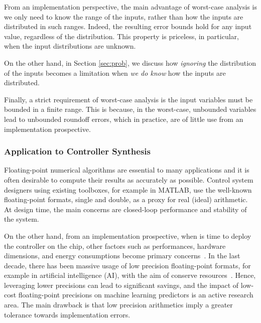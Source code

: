 %
From an implementation perspective, the main advantage of worst-case analysis is we only need to know the range of the inputs, rather than how the inputs are distributed in such ranges. 
%
Indeed, the resulting error bounds hold for any input value, regardless of the distribution.
%
%
This property is priceless, in particular, when the input distributions are unknown.
%

On the other hand, in Section \ref{sec:prob}, we discuss how \emph{ignoring} the distribution of the inputs becomes a limitation when \emph{we do know} how the inputs are distributed.
%

Finally, a strict requirement of worst-case analysis is the input variables must be bounded  in a finite range. This is because, in the worst-case, unbounded variables lead to unbounded roundoff errors, which in practice, are of little use from an implementation prospective.
\subsubsection{Application to Controller Synthesis}
Floating-point numerical algorithms are essential to many applications and it is often desirable to compute their results as accurately as possible.
%
Control system designers using existing toolboxes, for example in MATLAB, use the well-known floating-point formats, single and double, as a proxy for real (ideal) arithmetic. 
%
At design time, the main concerns are closed-loop performance and stability of the system.
%

%
%
On the other hand, from an implementation prospective, when is time to deploy the controller on the chip, other factors such as performances, hardware dimensions, and energy consumptions become primary concerns~\cite{suardi}.
%
In the last decade, there has been massive usage of low precision floating-point formats, for example in artificial intelligence (AI), with the aim of conserve resources~\cite{fppower}.
%
Hence, leveraging lower precisions can lead to significant savings, and the impact of low-cost floating-point precisions on machine learning predictors is an active research area.
%
The main drawback is that low precision arithmetics imply a greater tolerance towards implementation errors.
%

